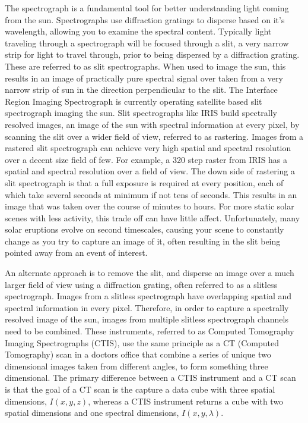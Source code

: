 The spectrograph is a fundamental tool for better understanding light coming from the sun. 
Spectrographs use diffraction gratings to disperse based on it's wavelength, allowing you to examine the spectral content.
Typically light traveling through a spectrograph will be focused through a slit, a very narrow strip for light to travel through, prior to being dispersed by a diffraction grating.
These are referred to as slit spectrographs.  
When used to image the sun, this results in an image of practically pure spectral signal over taken from a very narrow strip of sun in the direction perpendicular to the slit.
The Interface Region Imaging Spectrograph \citep[IRIS:][]{} is currently operating satellite based slit spectrograph imaging the sun.
Slit spectrographs like IRIS build spectrally resolved images, an image of the sun with spectral information at every pixel, by scanning the slit over a wider field of view, referred to as rastering.
Images from a rastered slit spectrograph can achieve very high spatial and spectral resolution over a decent size field of few.
For example, a 320 step raster from IRIS has a  spatial and spectral resolution over a  field of view.
The down side of rastering a slit spectrograph is that a full exposure is required at every position, each of which take several seconds at minimum if not tens of seconds.
This results in an image that was taken over the course of minutes to hours.
For more static solar scenes with less activity, this trade off can have little affect.
Unfortunately, many solar eruptions evolve on second timescales, causing your scene to constantly change as you try to capture an image of it, often resulting in the slit being pointed away from an event of interest.

An alternate approach is to remove the slit, and disperse an image over a much larger field of view using a diffraction grating, often referred to as a slitless spectrograph.
Images from a slitless spectrograph have overlapping spatial and spectral information in every pixel.
Therefore, in order to capture a spectrally resolved image of the sun, images from multiple slitless spectrograph channels need to be combined.
These instruments, referred to as Computed Tomography Imaging Spectrographs (CTIS), use the same principle as a CT (Computed Tomography) scan in a doctors office that combine a series of unique two dimensional images taken from different angles, to form something three dimensional.
The primary difference between a CTIS instrument and a CT scan is that the goal of a CT scan is the capture a data cube with three spatial dimensions, $I(x,y,z)$, whereas a CTIS instrument returns a cube with two spatial dimensions and one spectral dimensions, $I(x,y,\lambda)$.

